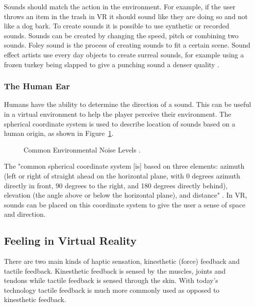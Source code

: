 Sounds should match the action in the environment. For example, if the user throws an item in the trash in VR it should sound like they are doing so and not like a dog bark. To create sounds it is possible to use synthetic or recorded sounds. Sounds can be created by changing the speed, pitch or combining two sounds. Foley sound is the process of creating sounds to fit a certain scene. Sound effect artists use every day objects to create surreal sounds, for example using a frozen turkey being slapped to give a punching sound a denser quality \cite{Madole1995}.   


\subsubsection{The Human Ear}
Humans have the ability to determine the direction of a sound. This can be useful in a virtual environment to help the player perceive their environment. The spherical coordinate system is used to describe location of sounds based on a human origin, as shown in Figure~\ref{fig:audiocoordinates}. 
\begin{figure}[!ht]
	\begin{center}
	\end{center}
	\caption{Common Environmental Noise Levels \cite{JIS2}.} \label{fig:audiocoordinates}
\end{figure}The "common spherical coordinate system [is] based on three elements: azimuth (left or right of straight ahead on the horizontal plane, with 0 degrees azimuth directly in front, 90 degrees to the right, and 180 degrees  directly behind), elevation (the angle above or below the horizontal plane), and distance" \cite{JIS2}. In VR, sounds can be placed on this coordinate system to give the user a sense of space and direction. 

\subsection{Feeling in Virtual Reality}
There are two main kinds of haptic sensation, kinesthetic (force) feedback and tactile feedback. Kinesthetic feedback is sensed by the muscles, joints and tendons while tactile feedback is sensed through the skin. With today's technology tactile feedback is much more commonly used as opposed to kinesthetic feedback.

